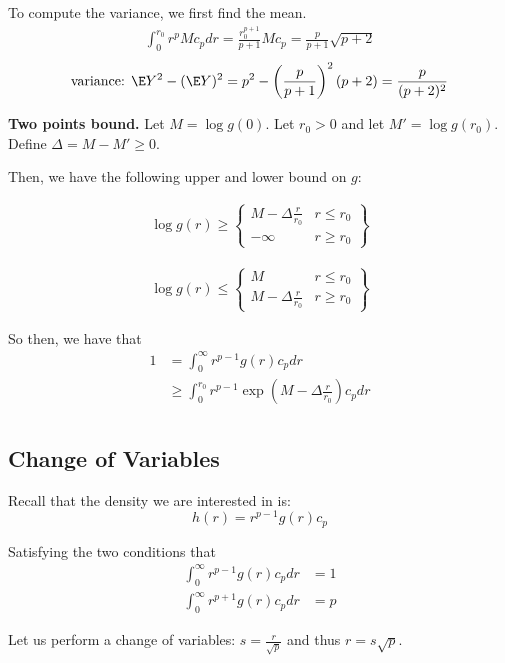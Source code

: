 \documentclass{article}
\begin{document}
To compute the variance, we first find the mean.
\begin{align*}
\int_0^{r_0} r^p M c_p dr = \frac{r_0^{p+1}}{p+1} M c_p = \frac{p}{p+1} \sqrt{p+2} 
\end{align*}
\[
\textrm{variance: } \E Y^2 - (\E Y)^2 = p^2 - \left(\frac{p}{p+1} \right)^2 (p+2) = \frac{p}{(p+2)^2}
\]


\textbf{Two points bound.} Let $M = \log g(0)$. Let $r_0 > 0$ and let $M' = \log g(r_0)$. Define $\Delta = M - M' \geq 0$. 

Then, we have the following upper and lower bound on $g$:

\begin{align*}
\log g(r) \geq \left\{ \begin{array}{cc} M - \Delta \frac{r}{r_0}   & r \leq r_0 \\
                             -\infty & r \geq r_0 \end{array} \right\}
\end{align*}

\begin{align*}
\log g(r) \leq \left\{ \begin{array}{cc} M & r \leq r_0 \\
                         M - \Delta \frac{r}{r_0} & r \geq r_0 
                      \end{array} \right\}
\end{align*}

So then, we have that
\begin{align*}
1 &= \int_0^\infty r^{p-1} g(r) c_p dr \\
 &\geq  \int_0^{r_0} r^{p-1} \exp\left( M - \Delta \frac{r}{r_0} \right) c_p dr \\
\end{align*}
\subsection{Change of Variables}

Recall that the density we are interested in is:
\[
h(r) = r^{p-1} g(r) c_p
\]

Satisfying the two conditions that
\begin{align*}
\int_0^\infty r^{p-1} g(r) c_p dr &= 1 \\
\int_0^\infty r^{p+1} g(r) c_p dr &= p 
\end{align*}

Let us perform a change of variables: $s = \frac{r}{\sqrt{p}}$ and thus $r = s \sqrt{p}$. 
\end{document}

